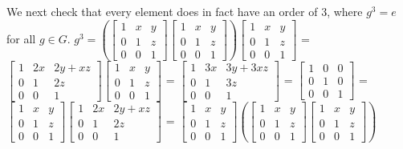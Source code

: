\documentclass[12pt,letterpaper,reqno]{amsart}
\begin{document}
\begin{enumerate}
\begin{flushleft}
We next check that every element does in fact have an order of 3, where  $g^3 = e$ for all $g \in G$.
\newline
$g^3 = \left(\begin{bmatrix} 1 & x & y \\0 & 1 & z\\ 0 & 0 & 1 \end{bmatrix}\begin{bmatrix} 1 & x & y \\0 & 1 & z\\ 0 & 0 & 1 \end{bmatrix}\right)\begin{bmatrix} 1 & x & y \\0 & 1 & z\\ 0 & 0 & 1 \end{bmatrix}$ = $\begin{bmatrix} 1 & 2x & 2y+xz \\0 & 1 & 2z\\ 0 & 0 & 1 \end{bmatrix}\begin{bmatrix} 1 & x & y \\0 & 1 & z\\ 0 & 0 & 1 \end{bmatrix}$ = $\begin{bmatrix} 1 & 3x & 3y+3xz \\0 & 1 & 3z\\ 0 & 0 & 1 \end{bmatrix}$ = $\begin{bmatrix} 1 & 0 & 0 \\0 & 1 & 0\\ 0 & 0 & 1 \end{bmatrix}$ = $\begin{bmatrix} 1 & x & y \\0 & 1 & z\\ 0 & 0 & 1 \end{bmatrix}\begin{bmatrix} 1 & 2x & 2y+xz \\0 & 1 & 2z\\ 0 & 0 & 1 \end{bmatrix}$ = $\begin{bmatrix} 1 & x & y \\0 & 1 & z\\ 0 & 0 & 1 \end{bmatrix}\left(\begin{bmatrix} 1 & x & y \\0 & 1 & z\\ 0 & 0 & 1 \end{bmatrix}\begin{bmatrix} 1 & x & y \\0 & 1 & z\\ 0 & 0 & 1 \end{bmatrix}\right)$
\newline


\end{flushleft}
\end{enumerate}
\end{document}
